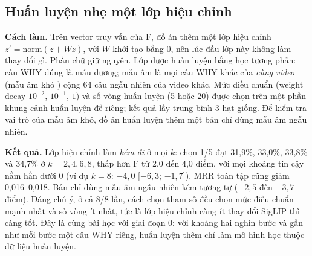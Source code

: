 \documentclass[a4paper,oneside]{report}
\begin{document}
\begin{table}[ht]
\centering
\caption{Giai đoạn 8a: cấu hình F so với tổ hợp gộp khung và kết hợp điểm được chọn trong mỗi lần kiểm tra chéo (2.503 bước, 27 video). Hiệu tính bằng điểm phần trăm (chọn 1/5) hoặc đơn vị MRR.}
\label{tab:stage8a}
\end{table}

\subsection{Huấn luyện nhẹ một lớp hiệu chỉnh}

\textbf{Cách làm.} Trên vector truy vấn của F, đồ án thêm một lớp hiệu chỉnh $z'=\mathrm{norm}(z+Wz)$, với $W$ khởi tạo bằng 0, nên lúc đầu lớp này không làm thay đổi gì. Phần chữ giữ nguyên. Lớp được huấn luyện bằng học tương phản: câu WHY đúng là mẫu dương; mẫu âm là mọi câu WHY khác của \textit{cùng video} (mẫu âm khó \citep{robinson2021hard}) cộng 64 câu ngẫu nhiên của video khác. Mức điều chuẩn (weight decay $10^{-2}$, $10^{-1}$, $1$) và số vòng huấn luyện (5 hoặc 20) được chọn trên một phần khung cảnh huấn luyện để riêng; kết quả lấy trung bình 3 hạt giống. Để kiểm tra vai trò của mẫu âm khó, đồ án huấn luyện thêm một bản chỉ dùng mẫu âm ngẫu nhiên.

\textbf{Kết quả.} Lớp hiệu chỉnh làm \textit{kém đi} ở mọi $k$: chọn 1/5 đạt 31,9\%, 33,0\%, 33,8\% và 34,7\% ở $k=2,4,6,8$, thấp hơn F từ 2,0 đến 4,0 điểm, với mọi khoảng tin cậy nằm hẳn dưới 0 (ví dụ $k=8$: $-4{,}0$ [$-6{,}3$; $-1{,}7$]). MRR toàn tập cũng giảm 0,016--0,018. Bản chỉ dùng mẫu âm ngẫu nhiên kém tương tự ($-2{,}5$ đến $-3{,}7$ điểm). Đáng chú ý, ở cả 8/8 lần, cách chọn tham số đều chọn mức điều chuẩn mạnh nhất và số vòng ít nhất, tức là lớp hiệu chỉnh càng ít thay đổi SigLIP thì càng tốt. Đây là cùng bài học với giai đoạn 0: với khoảng hai nghìn bước và gần như mỗi bước một câu WHY riêng, huấn luyện thêm chỉ làm mô hình học thuộc dữ liệu huấn luyện.
\end{document}
